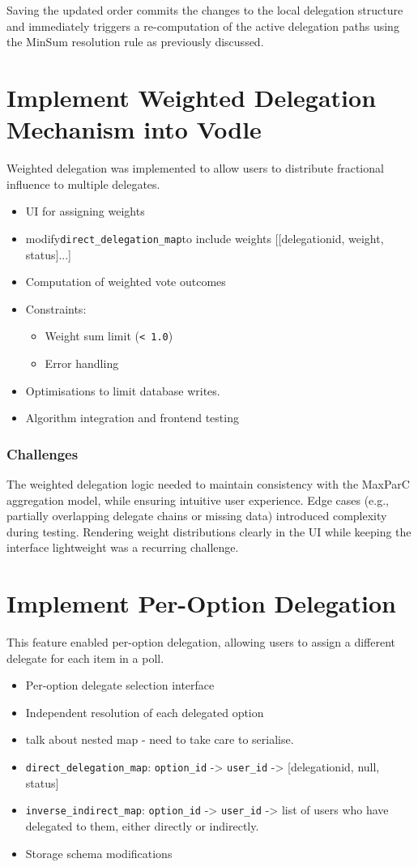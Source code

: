 Saving the updated order commits the changes to the local delegation structure and immediately triggers a re-computation of the active delegation paths using the MinSum resolution rule as previously discussed.

\section{Implement Weighted Delegation Mechanism into Vodle}
Weighted delegation was implemented to allow users to distribute fractional influence to multiple delegates.

\begin{itemize}
  \item UI for assigning weights
  \item modify\verb|direct_delegation_map|to include weights [[delegationid, weight, status]...]
  \item Computation of weighted vote outcomes
  \item Constraints:
  \begin{itemize}
    \item Weight sum limit (\texttt{< 1.0})
    \item Error handling
  \end{itemize}
  \item Optimisations to limit database writes.
  \item Algorithm integration and frontend testing
\end{itemize}

\subsubsection{Challenges}
The weighted delegation logic needed to maintain consistency with the MaxParC aggregation model, while ensuring intuitive user experience. Edge cases (e.g., partially overlapping delegate chains or missing data) introduced complexity during testing. Rendering weight distributions clearly in the UI while keeping the interface lightweight was a recurring challenge.

\section{Implement Per-Option Delegation}
This feature enabled per-option delegation, allowing users to assign a different delegate for each item in a poll.

\begin{itemize}
  \item Per-option delegate selection interface
  \item Independent resolution of each delegated option
  \item talk about nested map - need to take care to serialise.
  \item \verb|direct_delegation_map|: \verb|option_id| -> \verb|user_id| -> [delegationid, null, status]
  \item \verb|inverse_indirect_map|: \verb|option_id| -> \verb|user_id| -> list of users who have delegated to them, either directly or indirectly.
  \item Storage schema modifications
\end{itemize}

